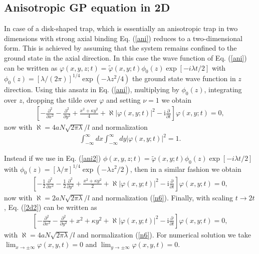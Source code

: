 \documentclass[onecolumn]{elsart3p}
\begin{document}
\label{1D}


\subsection{Anisotropic GP equation in 2D}

\label{2.5}

In case of a disk-shaped trap, which is essentially an
anisotropic
trap in two dimensions
with strong axial binding Eq.
(\ref{ani}) reduces to a two-dimensional form. This is achieved by
assuming that the system remains confined to the ground state in the
axial direction.  In this case the wave function of Eq.
(\ref{ani}) can be written as $\varphi(x,y,z;t) = \tilde \varphi(x,y;t)
\phi_0(z)\exp[-i\lambda t/2]$ with  $\phi_0(z)=
[\lambda/(2\pi)]^{1/4} \exp(-\lambda z^2/4)$ the  ground state
wave function in  $z$ direction. Using this ansatz in Eq.
(\ref{ani}), multiplying by $\phi_0(z)$, integrating over
$z$, dropping the tilde over $\varphi$ and setting $\nu =1$  we obtain
\begin{align}
\left[-\frac{\partial^2}
{\partial x^2}-\frac{\partial^2}
{\partial y^2}
+\frac{x^2+\kappa y^2}{4}+\aleph %
\left| {\varphi(x,y;t)}
\right| ^2
-\mbox{i}\frac{\partial }{\partial t}
\right] \varphi (x,y;t)=0  ,
\label{2d}
\end{align}
now with $\aleph %
= 4a N \sqrt {2
\pi \lambda} /l$ and
 normalization
\begin{align}\label{n6}
\int_{-\infty}^\infty dx
\int_{-\infty}^\infty dy
|\varphi(x,y;t)|^2 =1.
\end{align}

Instead if we use in Eq. (\ref{ani2})
$\phi(x,y,z;t) =\tilde  \varphi(x,y;t)
\phi_0(z)\exp[-i\lambda t/2]$ with  $\phi_0(z)=
[\lambda/\pi]^{1/4} \exp(-\lambda z^2/2)$,  then
in a similar fashion  we obtain
\begin{align}
\left[-\frac{1}{2}\frac{\partial^2}
{\partial x^2}-\frac{1}{2}\frac{\partial^2}
{\partial y^2}
+\frac{x^2+\kappa y^2}{2}+\aleph  %
\left| {\varphi(x,y;t)}
\right| ^2
-\mbox{i}\frac{\partial }{\partial t}
\right] \varphi (x,y;t)=0  ,
\label{2d2}
\end{align}
now with $\aleph  %
= 2a N \sqrt {2
\pi \lambda} /l$ and normalization (\ref{n6}). Finally, with scaling
$t\to 2t$, Eq. (\ref{2d2}) can be written as
\begin{align}
\left[-\frac{\partial^2}
{\partial x^2}-\frac{\partial^2}
{\partial y^2}
+{x^2+\kappa y^2}+\aleph %
\left| {\varphi(x,y;t)}
\right| ^2
-\mbox{i}\frac{\partial }{\partial t}
\right] \varphi (x,y;t)=0  ,
\label{2d3}
\end{align}
with $\aleph %
= 4a N \sqrt {2
\pi \lambda} /l$ and normalization (\ref{n6}).
For numerical solution we take $\lim_{x\to \pm \infty}\varphi(x,y,t)=0$
and $\lim_{y\to \pm \infty}\varphi(x,y,t)=0$.
\end{document}
